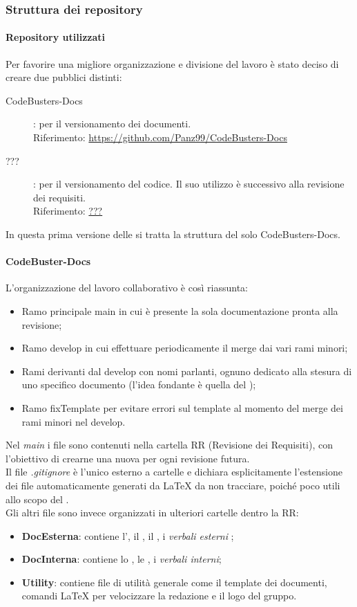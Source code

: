 \subsubsection{Struttura dei repository}
\paragraph{Repository utilizzati}
Per favorire una migliore organizzazione e divisione del lavoro è stato deciso di creare due  pubblici distinti:
\begin{description}
	\item[CodeBusters-Docs] : per il versionamento dei documenti. \\
	Riferimento: \url{https://github.com/Panz99/CodeBusters-Docs}
	\item[???] : per il versionamento del codice. Il suo utilizzo è successivo alla revisione dei requisiti. \\
	Riferimento: \url{???}
\end{description}
In questa prima versione delle \NdPv si tratta la struttura del solo  CodeBusters-Docs. 

\paragraph{CodeBuster-Docs}
L'organizzazione del lavoro collaborativo è così riassunta:
\begin{itemize}
	\item Ramo principale main in cui è presente la sola documentazione pronta alla revisione;	
	\item Ramo develop in cui effettuare periodicamente il merge dai vari rami minori;
	\item Rami derivanti dal develop con nomi parlanti, ognuno dedicato alla stesura di uno specifico documento (l'idea fondante è quella del );
	\item Ramo fixTemplate per evitare errori sul template al momento del merge dei rami minori nel develop.
\end{itemize}
Nel \textit{main} i file sono contenuti nella cartella RR (Revisione dei Requisiti), con l'obiettivo di crearne una nuova per ogni revisione futura. \\
Il file \textit{.gitignore} è l'unico esterno a cartelle e dichiara esplicitamente l'estensione dei file automaticamente generati da \LaTeX{} da non tracciare, poiché poco utili allo scopo del . \\
Gli altri file sono invece organizzati in ulteriori cartelle dentro la RR:
\begin{itemize}
	\item \textbf{DocEsterna}: contiene l'\AdRv, il \PdPv, il \Glossariov, i \textit{verbali esterni} ;
	\item \textbf{DocInterna}: contiene lo \SdFv, le \NdPv, i \textit{verbali interni};
	\item \textbf{Utility}: contiene file di utilità generale come il template dei documenti, comandi \LaTeX{} per velocizzare la redazione e il logo del gruppo.
\end{itemize}
	

